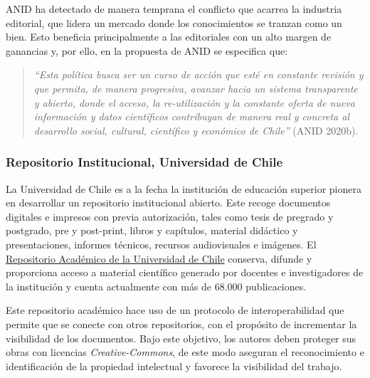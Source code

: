 \documentclass[
  spanish,
  letterpaper,
  DIV=11,
  numbers=noendperiod]{scrreprt}
\begin{document}
ANID ha detectado de manera temprana el conflicto que acarrea la
industria editorial, que lidera un mercado donde los conocimientos se
tranzan como un bien. Esto beneficia principalmente a las editoriales
con un alto margen de ganancias y, por ello, en la propuesta de ANID se
especifica que:

\begin{quote}
\emph{``Esta política busca ser un curso de acción que esté en constante
revisión y que permita, de manera progresiva, avanzar hacia un sistema
transparente y abierto, donde el acceso, la re-utilización y la
constante oferta de nueva información y datos científicos contribuyan de
manera real y concreta al desarrollo social, cultural, científico y
económico de Chile''} (ANID 2020b).
\end{quote}

\subsubsection*{\texorpdfstring{\textbf{Repositorio Institucional,
Universidad de
Chile}}{Repositorio Institucional, Universidad de Chile}}\label{repositorio-institucional-universidad-de-chile}

La Universidad de Chile es a la fecha la institución de educación
superior pionera en desarrollar un repositorio institucional abierto.
Este recoge documentos digitales e impresos con previa autorización,
tales como tesis de pregrado y postgrado, pre y post-print, libros y
capítulos, material didáctico y presentaciones, informes técnicos,
recursos audiovisuales e imágenes. El
\href{http://repositorio.uchile.cl/}{Repositorio Académico de la
Universidad de Chile} conserva, difunde y proporciona acceso a material
científico generado por docentes e investigadores de la institución y
cuenta actualmente con más de 68.000 publicaciones.

Este repositorio académico hace uso de un protocolo de interoperabilidad
que permite que se conecte con otros repositorios, con el propósito de
incrementar la visibilidad de los documentos. Bajo este objetivo, los
autores deben proteger sus obras con licencias \emph{Creative-Commons},
de este modo aseguran el reconocimiento e identificación de la propiedad
intelectual y favorece la visibilidad del trabajo.
\end{document}

